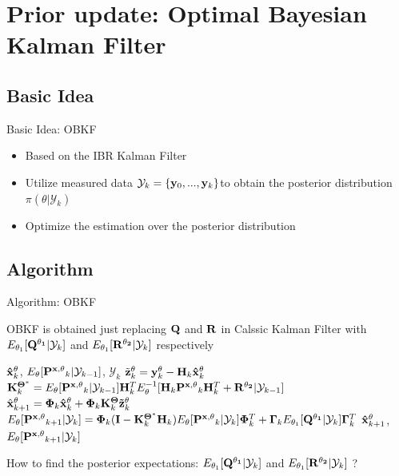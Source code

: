 \section{Prior update: Optimal Bayesian Kalman Filter}

\begin{frame}
    \tableofcontents[currentsection]
\end{frame}

\subsection{Basic Idea}
\begin{frame}{Basic Idea: OBKF}
    \begin{itemize}
        \item Based on the IBR Kalman Filter
        \item Utilize measured data $\mathcal{Y}_{k}=\{{\bf y}_0,...,{\bf y}_{k}\}$to obtain the posterior distribution $\pi(\theta|\mathcal{Y}_k)$
        \item Optimize the estimation over the posterior distribution 
    \end{itemize}
\end{frame}


\subsection{Algorithm}
\begin{frame}{Algorithm: OBKF}

OBKF is obtained just replacing ${\bf Q}$ and ${\bf R}$ in Calssic Kalman Filter with $E_{\theta_1}[{\bf Q^{\theta_1}}|\mathcal{Y}_k]$ and $E_{\theta_1}[{\bf R^{\theta_2}}|\mathcal{Y}_k]$ respectively
\begin{algorithm}[H]
\caption{OBKF}
\begin{algorithmic}[1]
\REQUIRE ${\bf \hat x}^{\theta}_k$, $E_\theta[{\bf P^{x, \theta}}_{k}|\mathcal{Y}_{k-1}]$, $\mathcal{Y}_k$
\STATE $\tilde {\bf z}^{\bf \theta}_k = {\bf y}^{\bf \theta}_k - {\bf H}_k{\bf \hat x}^{\bf \theta}_k$
\STATE ${\bf K}^{\bf \Theta^*}_k = E_\theta[{\bf P^{x, \theta}}_k|\mathcal{Y}_{k-1}]{\bf H}^T_kE_\theta^{-1}[{\bf H}_k{\bf P^{x, \theta}}_k{\bf H}^T_k+{\bf R^{\theta_2}}|\mathcal{Y}_{k-1}]$
\STATE $\hat{\bf x}^{\theta}_{k+1} = {\bf \Phi}_k{\bf \hat x}^{\theta}_k+{\bf \Phi}_k{\bf K}^{\bf \Theta}_k{\bf \tilde z}^{\theta}_k$
\STATE $E_\theta[{\bf P^{x, \theta}}_{k+1}|\mathcal{Y}_k] = {\bf \Phi}_k({\bf I}-{\bf K}^{\bf \Theta^*}_k{\bf H}_k)E_\theta[{\bf P^{x, \theta}}_k|\mathcal{Y}_k]{\bf \Phi}^T_k + {\bf \Gamma}_kE_{\theta_1}[{\bf Q^{\theta_1}}|\mathcal{Y}_k]{\bf \Gamma}_k^T$
\ENSURE ${\bf \hat x}^{\theta}_{k+1}$, $E_\theta[{\bf P^{x, \theta}}_{k+1}|\mathcal{Y}_{k}]$
\end{algorithmic}
\end{algorithm}

\pause

How to find the posterior expectations: $E_{\theta_1}[{\bf Q^{\theta_1}}|\mathcal{Y}_k]$ and $E_{\theta_1}[{\bf R^{\theta_2}}|\mathcal{Y}_k]$ ?

\end{frame}

